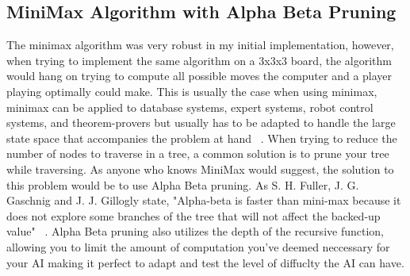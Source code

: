 \documentclass[letterpaper]{article}
\begin{document}
\subsection{MiniMax Algorithm with Alpha Beta Pruning}
The minimax algorithm was very robust in my initial implementation, however, when trying to implement the same algorithm on a 3x3x3 board, the algorithm would hang on trying to compute all possible moves the computer and a player playing optimally could make. This is usually the case when using minimax, minimax can be applied to database systems, expert systems, robot control systems, and theorem-provers but usually has to be adapted to handle the large state space that accompanies the problem at hand ~\cite{boro}. When trying to reduce the number of nodes to traverse in a tree, a common solution is to prune your tree while traversing. As anyone who knows MiniMax would suggest, the solution to this problem would be to use Alpha Beta pruning. As S. H. Fuller, J. G. Gaschnig and J. J. Gillogly state, "Alpha-beta is faster than mini-max because it does not explore some branches of the tree that will not affect the backed-up value" ~\cite{fullegaschnigillogly1973}. Alpha Beta pruning also utilizes the depth of the recursive function, allowing you to limit the amount of computation you've deemed neccessary for your AI making it perfect to adapt and test the level of diffuclty the AI can have. 
\end{document}
